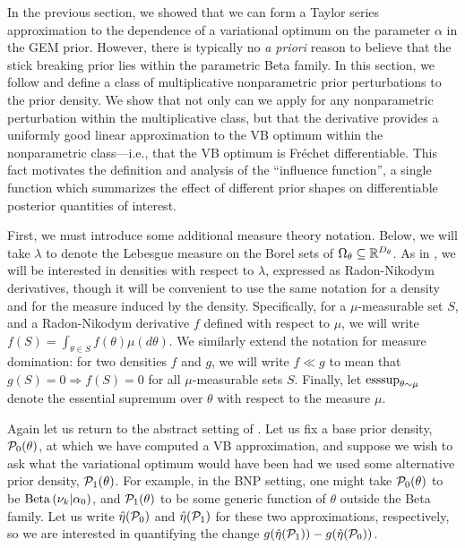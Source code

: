 In the previous section, we showed that we can form a Taylor series
approximation to the dependence of a variational optimum on the parameter
$\alpha$ in the GEM prior.  However, there is typically no {\em a priori} reason
to believe that the stick breaking prior lies within the parametric Beta family.
In this section, we follow \citet{gustafson:1996:local} and define a class of
multiplicative nonparametric prior perturbations to the prior density.  We show
that not only can we apply  for any nonparametric
perturbation within the multiplicative class, but that the derivative provides a
uniformly good linear approximation to the VB optimum within the nonparametric
class---i.e., that the VB optimum is Fr{\'e}chet differentiable.  This fact
motivates the definition and analysis of the ``influence function'', a
single function which summarizes the effect of different prior shapes on
differentiable posterior quantities of interest.

First, we must introduce some additional measure theory notation. Below, we will
take $\lambda$ to denote the Lebesgue measure on the Borel sets of $\Omega_{\theta}
\subseteq \mathbb{R}^{{D_{\theta}}}$.  As in , we will be
interested in densities with respect to $\lambda$, expressed as Radon-Nikodym
derivatives, though it will be convenient to use the same notation for a density
and for the measure induced by the density.  Specifically, for a
$\mu$-measurable set $S$, and a Radon-Nikodym derivative $f$ defined with
respect to $\mu$, we will write $f(S) = \int_{\theta \in S} f(\theta)
\mu(d\theta)$.  We similarly extend the notation for measure domination: for two
densities $f$ and $g$, we will write $f \ll g$ to mean that $g(S) = 0
\Rightarrow f(S) = 0$ for all $\mu$-measurable sets $S$.  Finally, let
$\operatorname*{\mathrm{esssup}}_{\theta\sim\mu}$ denote the essential supremum over $\theta$ with
respect to the measure $\mu$.

Again let us return to the abstract setting of . Let us fix a
base prior density, $\mathcal{P}_{0}(\theta)$, at which we have computed a VB
approximation, and suppose we wish to ask what the variational optimum would
have been had we used some alternative prior density, $\mathcal{P}_{1}(\theta)$. For
example, in the BNP setting, one might take $\mathcal{P}_{0}(\theta)$ to be
$\mathrm{Beta}\left(\nu_{k} \vert \alpha_0\right)$, and $\mathcal{P}_{1}(\theta)$ to be some generic
function of $\theta$ outside the Beta family. Let us write $\hat\eta(\mathcal{P}_{0})$ and
$\hat\eta(\mathcal{P}_{1})$ for these two approximations, respectively, so we are
interested in quantifying the change $g(\hat\eta(\mathcal{P}_{1})) - g(\hat\eta(\mathcal{P}_{0}))$.


